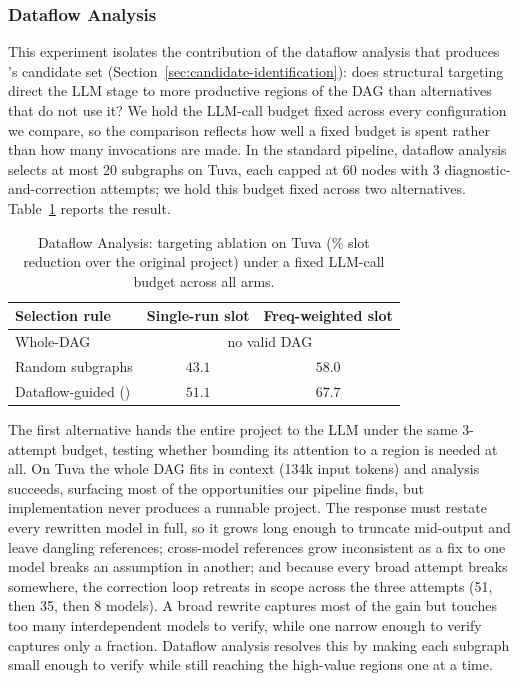 \subsubsection{Dataflow Analysis}
\label{sec:eval-ablation-dataflow}

This experiment isolates the contribution of the dataflow analysis that produces \tool{}'s candidate set (Section~\ref{sec:candidate-identification}): does structural targeting direct the LLM stage to more productive regions of the DAG than alternatives that do not use it? We hold the LLM-call budget fixed across every configuration we compare, so the comparison reflects how well a fixed budget is spent rather than how many invocations are made. In the standard pipeline, dataflow analysis selects at most 20 subgraphs on Tuva, each capped at 60 nodes with 3 diagnostic-and-correction attempts; we hold this budget fixed across two alternatives. Table~\ref{tab:ablation-dataflow} reports the result.

\begin{table}[tb]
\centering
\caption{Dataflow Analysis: targeting ablation on Tuva (\% slot reduction over the original project) under a fixed LLM-call budget across all arms.}
\inv
\label{tab:ablation-dataflow}
\small
\begin{tabular}{lcc}
\toprule
Selection rule & Single-run slot & Freq-weighted slot \\
\midrule
Whole-DAG                  & \multicolumn{2}{c}{no valid DAG} \\
Random subgraphs           & $43.1$ & $58.0$ \\
Dataflow-guided (\tool{})  & $\mathbf{51.1}$ & $\mathbf{67.7}$ \\
\bottomrule
\end{tabular}
\inv
\end{table}

 The first alternative hands the entire project to the LLM under the same 3-attempt budget, testing whether bounding its attention to a region is needed at all. On Tuva the whole DAG fits in context (134k input tokens) and analysis succeeds, surfacing most of the opportunities our pipeline finds, but implementation never produces a runnable project. The response must restate every rewritten model in full, so it grows long enough to truncate mid-output and leave dangling references; cross-model references grow inconsistent as a fix to one model breaks an assumption in another; and because every broad attempt breaks somewhere, the correction loop retreats in scope across the three attempts (51, then 35, then 8 models). A broad rewrite captures most of the gain but touches too many interdependent models to verify, while one narrow enough to verify captures only a fraction. Dataflow analysis resolves this by making each subgraph small enough to verify while still reaching the high-value regions one at a time.

